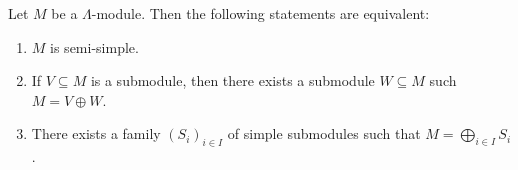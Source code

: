 %




\begin{proposition}\label{1.2.1}
Let $M$ be a $\Lambda$-module. Then the following statements are equivalent:
\begin{enumerate}
\item $M$ is semi-simple.
\item If $V\subseteq M$ is a submodule, then there exists a submodule $W\subseteq M$ such $M=V\oplus W$.
\item There exists a family $(S_i)_{i\in I}$ of simple submodules such that $M=\bigoplus_{i\in I} S_i$.
\end{enumerate}
\end{proposition}



